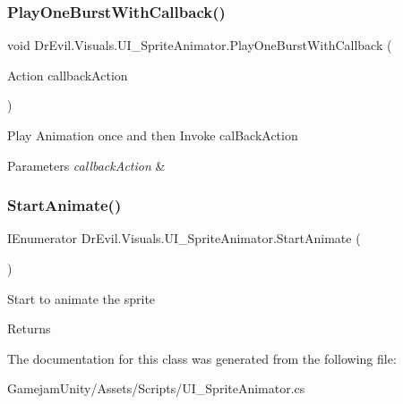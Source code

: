 \subsubsection{\texorpdfstring{Play\+One\+Burst\+With\+Callback()}{PlayOneBurstWithCallback()}}
{\footnotesize\ttfamily void Dr\+Evil.\+Visuals.\+U\+I\+\_\+\+Sprite\+Animator.\+Play\+One\+Burst\+With\+Callback (\begin{DoxyParamCaption}\item[{Action}]{callback\+Action }\end{DoxyParamCaption})\hspace{0.3cm}{\ttfamily [inline]}}



Play Animation once and then Invoke cal\+Back\+Action 


\begin{DoxyParams}{Parameters}
{\em callback\+Action} & \\
\hline
\end{DoxyParams}
\mbox{\label{class_dr_evil_1_1_visuals_1_1_u_i___sprite_animator_abe0f4c138486d258edf5c55c3ae5e797}} 
\subsubsection{\texorpdfstring{Start\+Animate()}{StartAnimate()}}
{\footnotesize\ttfamily I\+Enumerator Dr\+Evil.\+Visuals.\+U\+I\+\_\+\+Sprite\+Animator.\+Start\+Animate (\begin{DoxyParamCaption}{ }\end{DoxyParamCaption})\hspace{0.3cm}{\ttfamily [inline]}}



Start to animate the sprite 

\begin{DoxyReturn}{Returns}

\end{DoxyReturn}


The documentation for this class was generated from the following file\+:\begin{DoxyCompactItemize}
\item 
Gamejam\+Unity/\+Assets/\+Scripts/U\+I\+\_\+\+Sprite\+Animator.\+cs\end{DoxyCompactItemize}
